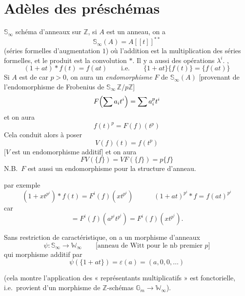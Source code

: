 \documentclass[11pt,a4paper]{article}
\begin{document}
\section{Adèles des préschémas}

$\mathbb{S}_\infty$ schéma d'anneaux  sur $\mathbb{Z}$, si $A$
est un anneau, on a
\[
\mathbb{S}_\infty(A) = A[[t]]^{**}
\]
(séries formelles d'augmentation $1$) où l'addition est la multiplication
des séries formelles, et le produit est la convolution $*$. Il y a aussi
des opérations $\lambda^{i}$. ,
\[
(1 + at) * f(t) = f(at) \qquad \text{i.e.} \qquad \{1 + at\}\{f(t)\} = \{f(at)\}
\]
Si $A$ est de car $p > 0$, on aura un \emph{endomorphisme} $F$ de
$\mathbb{S}_\infty(A)$ [provenant de l'endomorphisme de Frobenius de
$\mathbb{S}_\infty\, \mathbb{Z}/p\mathbb{Z}$]
\[
F\Bigl(\sum a_i t^{i}\Bigr) = \sum a_i^{p} t^{i}
\]
et on aura
\[
f(t)^{p} = F(f)(t^{p})
\]
Cela conduit alors à poser
\[
V(f)(t) = f(t^{p})
\]
[$V$ est un endomorphisme additif] et on aura
\[
FV(\{f\}) = VF(\{f\}) = p\{f\}
\]
N.B.\ $F$ est aussi un endomorphisme pour la structure d'anneau.

\struck{\ill{} \ill{}} par exemple
\[
(1 + x t^{p^{i}}) * f(t) = F^{i}(f)(x t^{p^{i}}) \qquad\quad (1 + at)^{p^{i}} * f = f(at)^{p^{i}}
\]
car 
\[
= F^{i}(f)(a^{p^{i}} t^{p^{i}}) = F^{i}(f)(x t^{p^{i}}).
\]

Sans restriction \struck{\ill{}} de caractéristique, on a un morphisme
d'anneaux
\[
\psi \colon \mathbb{S}_\infty \longrightarrow \mathbb{W}_\infty
\qquad \text{[anneau de Witt pour le nb premier } p\text{]}
\]
qui \ill{} \ill{} \ill{} morphisme additif  par
\[
\psi(\{1 + at\}) = \varepsilon(a) = (a, 0, 0, \ldots)
\]

(cela montre \ill{} \ill{} \ill{} l'application des « représentants
multiplicatifs » est fonctorielle, i.e.\ provient d'un morphisme de
$\mathbb{Z}$-schémas $\mathbb{G}_m \to \mathbb{W}_\infty$).
\end{document}
